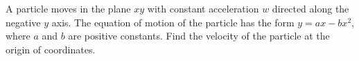 
\item A particle moves in the plane $xy$ with constant acceleration $w$ directed along the negative $y$ axis. The equation of motion of the particle has the form $y = ax - bx^2$, where $a$ and $b$ are positive constants. Find the velocity of the particle at the origin of coordinates.
